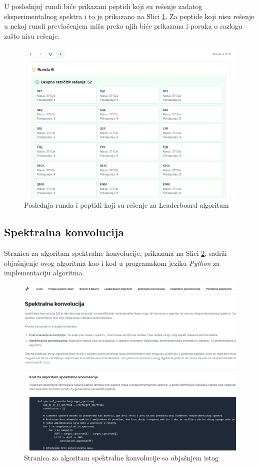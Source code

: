 \documentclass[12pt,oneside]{memoir}
\begin{document}
U poslednjoj rundi biće prikazani peptidi koji su rešenje zadatog eksperimentalnog spektra i to je prikazano na Slici \ref{fig:leaderboard_3}. Za peptide koji nisu rešenje u nekoj rundi prevlačenjem miša preko njih biće prikazana i poruka o razlogu zašto nisu rešenje.
\begin{figure}[H]
\centering
\includegraphics[width=1\textwidth]{images/leaderboard_3.png}
\caption{Poslednja runda i peptidi koji su rešenje za Leaderboard algoritam}
\label{fig:leaderboard_3}
\end{figure}

\subsection{Spektralna konvolucija}
Stranica za algoritam spektralne konvolucije, prikazana na Slici \ref{fig:convolution_1}, sadrži objašnjenje ovog algoritma kao i kod u programskom jeziku \emph{Python} za implementaciju algoritma.
\begin{figure}[H]
\centering
\includegraphics[width=1\textwidth]{images/convolution_1.png}
\caption{Stranica za algoritam spektralne konvolucije sa objašnjem istog}
\label{fig:convolution_1}
\end{figure}
\end{document}
